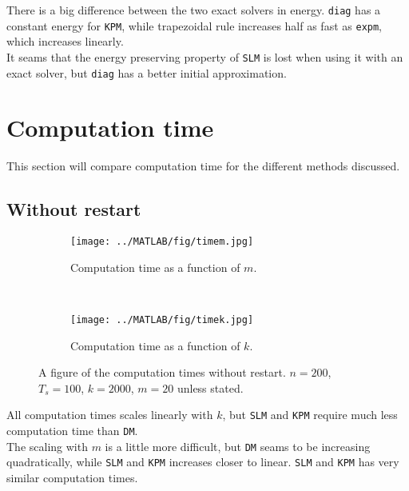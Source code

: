 There is a big difference between the two exact solvers in energy. \texttt{diag} has a constant energy for \texttt{KPM}, while trapezoidal rule increases half as fast as \texttt{expm}, which increases linearly.\\
It seams that the energy preserving property of \texttt{SLM} is lost when using it with an exact solver, but \texttt{diag} has a better initial approximation. \\
\section{Computation time}%
\label{sec:cruntime}
This section will compare computation time for the different methods discussed. 

\subsection{Without restart}

\begin{figure}[H]
        \centering
        \begin{subfigure}[b]{0.45\textwidth}
                \texttt{[image: ../MATLAB/fig/timem.jpg]}
                \caption{ Computation time as a function of $m$. }
                \label{fig:timem}
        \end{subfigure}
        ~
        \begin{subfigure}[b]{0.45\textwidth}
                \texttt{[image: ../MATLAB/fig/timek.jpg]}
                \caption{ Computation time as a function of $k$. }
                \label{fig:timek}
        \end{subfigure}
        \caption{ A figure of the computation times without restart. $n = 200$, $T_s = 100$, $k = 2000$, $m = 20$ unless stated. }
        \label{fig:time0}
\end{figure}
All computation times scales linearly with $k$, but \texttt{SLM} and \texttt{KPM} require much less computation time than \texttt{DM}. \\
The scaling with $m$ is a little more difficult, but \texttt{DM} seams to be increasing quadratically, while \texttt{SLM} and \texttt{KPM} increases closer to linear. \texttt{SLM} and \texttt{KPM} has very similar computation times.
